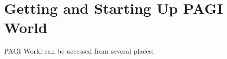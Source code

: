 \documentclass[11pt]{article}
\begin{document}
%
%
%
%
%
%
%
%
%
%
\section{Getting and Starting Up PAGI World}

PAGI World can be accessed from several places:
\end{document}

